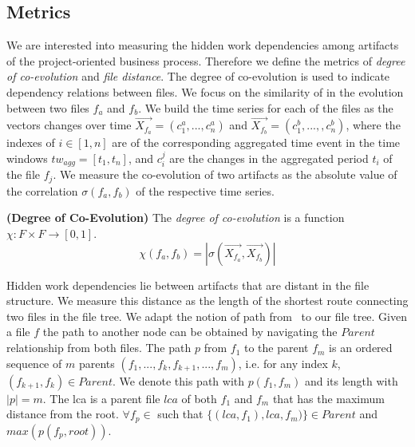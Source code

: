 \subsection{Metrics}

We are interested into measuring the hidden work dependencies among artifacts of the project-oriented business process. Therefore we define the metrics of \emph{degree of co-evolution} and \emph{file distance}. The degree of co-evolution is used to indicate dependency relations between files. We focus on the similarity of in the evolution between two files $f_a$ and $f_b$. We build the time series for each of the files as the vectors changes over time $\vec{X_{f_a}} = (c_1^a, ..., c_n^a)$ and $\vec{X_{f_b}} = (c_1^b, ..., ,c_n^b)$, where the indexes of $i \in [1,n]$ are of the corresponding aggregated time event in the time windows $tw_{agg} = [t_1,t_n]$, and $c_i^j$ are the changes in the aggregated period $t_i$ of the file $f_j$. We measure the co-evolution of two artifacts as the absolute value of the correlation $\sigma(f_a,f_b)$ of the respective time series.

\begin{definition} {\bf (Degree of Co-Evolution)} 
	\label{definition:degree-of-coevolution}
	The \emph{degree of co-evolution} is a function $\chi: F \times F \rightarrow [0,1]$. 
	\[
	\chi(f_a,f_b) = |\sigma (\vec{X_{f_a}}, \vec{X_{f_b}})|
	\]	
\end{definition}


Hidden work dependencies lie between artifacts that are distant in the file structure. We measure this distance as the length of the shortest route connecting two files in the file tree. We adapt the notion of path from~\cite{Gubichev2010} to our file tree. Given a file $f$ the path to another node can be obtained by navigating the $Parent$ relationship from both files. The path $p$ from $f_1$ to the parent $f_m$ is an ordered sequence of $m$ parents $(f_1, ..., f_k, f_{k+1}, ..., f_{m})$, i.e. for any index $k$, $(f_{k+1}, f_k) \in Parent$. We denote this path with $p(f_1,f_m)$ and its length with $|p| = m$. The \gls{lca} is a parent file $lca$ of both $f_1$ and $f_m$ that has the maximum distance from the root. 
$\forall f_p \in $
such that $\{(lca, f_1), lca, f_m)\} \in Parent$ and $max (p(f_p, root))$. 

